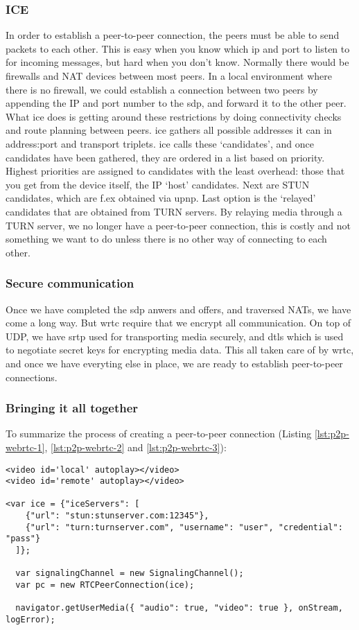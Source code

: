 \subsubsection{ICE}
In order to establish a peer-to-peer connection, the peers must be able to send packets to each other. This is easy when you know which ip and port to listen to for incoming messages, but hard when you don't know. Normally there would be firewalls and NAT devices between most peers. In a local environment where there is no firewall, we could establish a connection between two peers by appending the IP and port number to the \gls{sdp}, and forward it to the other peer. What \gls{ice} does is getting around these restrictions by doing connectivity checks and route planning between peers. \gls{ice} gathers all possible addresses it can in address:port and transport triplets\cite{ivov_ice_2013}. \gls{ice} calls these `candidates', and once candidates have been gathered, they are ordered in a list based on priority. Highest priorities are assigned to candidates with the least overhead: those that you get from the device itself, the IP `host' candidates. Next are STUN candidates, which are f.ex obtained via \gls{upnp}. Last option is the `relayed' candidates that are obtained from TURN servers. By relaying media through a TURN server, we no longer have a peer-to-peer connection, this is costly and not something we want to do unless there is no other way of connecting to each other.

\subsubsection{Secure communication}
Once we have completed the \gls{sdp} anwers and offers, and traversed NATs, we have come a long way. But \gls{wrtc} require that we encrypt all communication. On top of UDP, we have \gls{srtp} used for transporting media securely, and \gls{dtls} which is used to negotiate secret keys for encrypting media data. This all taken care of by \gls{wrtc}, and once we have everyting else in place, we are ready to establish peer-to-peer connections.

\subsubsection{Bringing it all together}
To summarize the process of creating a peer-to-peer connection (Listing \ref{lst:p2p-webrtc-1}, \ref{lst:p2p-webrtc-2} and \ref{lst:p2p-webrtc-3}):

\begin{lstlisting}[caption={Initializing a WebRTC P2P connection, Part I}, label={lst:p2p-webrtc-1}]
<video id='local' autoplay></video>
<video id='remote' autoplay></video>

<var ice = {"iceServers": [
    {"url": "stun:stunserver.com:12345"},
    {"url": "turn:turnserver.com", "username": "user", "credential": "pass"}
  ]};

  var signalingChannel = new SignalingChannel();
  var pc = new RTCPeerConnection(ice);

  navigator.getUserMedia({ "audio": true, "video": true }, onStream, logError);
\end{lstlisting}

